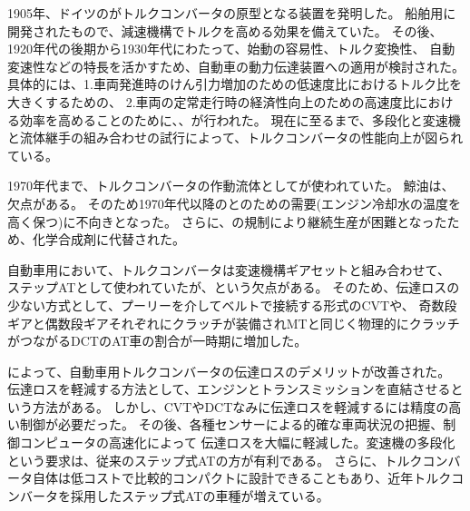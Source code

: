 \vspace{-5mm}
\vspace{5mm}
1905年、ドイツの\textbf{}がトルクコンバータの原型となる装置を発明した。
船舶用に開発されたもので、減速機構でトルクを高める効果を備えていた。
その後、1920年代の後期から1930年代にわたって、始動の容易性、トルク変換性、
自動変速性などの特長を活かすため、自動車の動力伝達装置への適用が検討された。
具体的には、1.車両発進時のけん引力増加のための低速度比におけるトルク比を大きくするための\textbf{}、
2.車両の定常走行時の経済性向上のための高速度比における効率を高めることのために、\textbf{}、\textbf{}が行われた。
現在に至るまで、多段化と変速機と流体継手の組み合わせの試行によって、トルクコンバータの性能向上が図られている。

1970年代まで、トルクコンバータの作動流体として\textbf{}が使われていた。
鯨油は、\textbf{}欠点がある。
そのため1970年代以降の\textbf{}と\textbf{}のための需要(エンジン冷却水の温度を高く保つ)に不向きとなった。
さらに、\textbf{}の規制により継続生産が困難となったため、化学合成剤に代替された。

自動車用において、トルクコンバータは変速機構ギアセットと組み合わせて、
ステップATとして使われていたが、\textbf{}という欠点がある。
そのため、伝達ロスの少ない方式として、プーリーを介してベルトで接続する形式のCVTや、
奇数段ギアと偶数段ギアそれぞれにクラッチが装備されMTと同じく物理的にクラッチがつながるDCTのAT車の割合が一時期に増加した。

\textbf{}によって、自動車用トルクコンバータの伝達ロスのデメリットが改善された。
伝達ロスを軽減する方法として、エンジンとトランスミッションを直結させる\textbf{}という方法がある。
しかし、CVTやDCTなみに伝達ロスを軽減するには精度の高い制御が必要だった。
その後、各種センサーによる的確な車両状況の把握、制御コンピュータの高速化によって
伝達ロスを大幅に軽減した。変速機の多段化という要求は、従来のステップ式ATの方が有利である。
さらに、トルクコンバータ自体は低コストで比較的コンパクトに設計できることもあり、近年トルクコンバータを採用したステップ式ATの車種が増えている。